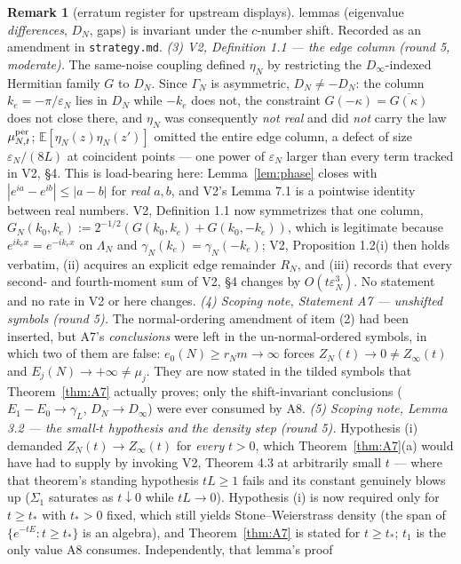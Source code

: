 \documentclass[11pt,a4paper]{article}
\theoremstyle{plain}
\theoremstyle{definition}
\newtheorem{remark}[theorem]{Remark}
\newcommand{\E}{\mathbb{E}}
\newcommand{\eps}{\varepsilon}
\begin{document}
\begin{remark}[erratum register for upstream displays]
lemmas (eigenvalue \emph{differences}, $D_N$, gaps) is invariant under
the $c$-number shift. Recorded as an amendment in \texttt{strategy.md}.
\emph{(3) V2, Definition 1.1 --- the edge column (round 5, moderate).} The
same-noise coupling defined $\eta_N$ by restricting the $D_\infty$-indexed
Hermitian family $G$ to $D_N$. Since $\Gamma_N$ is asymmetric, $D_N\ne-D_N$: the
column $k_e=-\pi/\eps_N$ lies in $D_N$ while $-k_e$ does not, the constraint
$G(-\kappa)=\overline{G(\kappa)}$ does not close there, and $\eta_N$ was
consequently \emph{not real} and did \emph{not} carry the law $\mu^{\rm per}_{N,t}$;
$\E[\eta_N(z)\eta_N(z')]$ omitted the entire edge column, a defect of size
$\eps_N/(8L)$ at coincident points --- one power of $\eps_N$ larger than every term
tracked in V2, \S4. This is load-bearing here: Lemma~\ref{lem:phase} closes with
$|e^{ia}-e^{ib}|\le|a-b|$ for \emph{real} $a,b$, and V2's Lemma 7.1 is a pointwise
identity between real numbers. V2, Definition 1.1 now symmetrizes that one column,
$G_N(k_0,k_e):=2^{-1/2}(G(k_0,k_e)+G(k_0,-k_e))$, which is legitimate because
$e^{ik_ex}=e^{-ik_ex}$ on $\Lambda_N$ and $\gamma_N(k_e)=\gamma_N(-k_e)$; V2,
Proposition 1.2(i) then holds verbatim, (ii) acquires an explicit edge remainder
$R_N$, and (iii) records that every second- and fourth-moment sum of V2, \S4 changes
by $O(t\eps_N^3)$. No statement and no rate in V2 or here changes.
\emph{(4) Scoping note, Statement A7 --- unshifted symbols (round 5).} The
normal-ordering amendment of item (2) had been inserted, but A7's \emph{conclusions}
were left in the un-normal-ordered symbols, in which two of them are false:
$e_0(N)\ge r_Nm\to\infty$ forces $Z_N(t)\to0\ne Z_\infty(t)$ and
$E_j(N)\to+\infty\ne\mu_j$. They are now stated in the tilded symbols that
Theorem~\ref{thm:A7} actually proves; only the shift-invariant conclusions
($E_1-E_0\to\gamma_L$, $D_N\to D_\infty$) were ever consumed by A8.
\emph{(5) Scoping note, Lemma 3.2 --- the small-$t$ hypothesis and the density step
(round 5).} Hypothesis (i) demanded $Z_N(t)\to Z_\infty(t)$ for \emph{every} $t>0$,
which Theorem~\ref{thm:A7}(a) would have had to supply by invoking V2, Theorem 4.3
at arbitrarily small $t$ --- where that theorem's standing hypothesis $tL\ge1$ fails
and its constant genuinely blows up ($\Sigma_1$ saturates as $t\downarrow0$ while
$tL\to0$). Hypothesis (i) is now required only for $t\ge t_*$ with $t_*>0$ fixed,
which still yields Stone--Weierstrass density (the span of
$\{e^{-tE}:t\ge t_*\}$ is an algebra), and Theorem~\ref{thm:A7} is stated for
$t\ge t_*$; $t_1$ is the only value A8 consumes. Independently, that lemma's proof

\end{remark}
\end{document}
